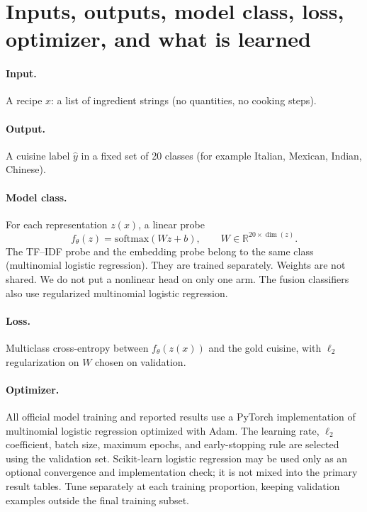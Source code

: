 ﻿\documentclass[11pt,letterpaper]{article}
\begin{document}
\section{Inputs, outputs, model class, loss, optimizer, and what is learned}

\paragraph{Input.}
A recipe $x$: a list of ingredient strings (no quantities, no cooking steps).

\paragraph{Output.}
A cuisine label $\hat{y}$ in a fixed set of 20 classes (for example Italian, Mexican, Indian, Chinese).

\paragraph{Model class.}
For each representation $z(x)$, a linear probe
\[
f_\theta(z)=\mathrm{softmax}(Wz+b),\qquad W\in\mathbb{R}^{20\times \dim(z)}.
\]
The TF--IDF probe and the embedding probe belong to the same class (multinomial logistic regression). They are trained separately. Weights are not shared. We do not put a nonlinear head on only one arm. The fusion classifiers also use regularized multinomial logistic regression.

\paragraph{Loss.}
Multiclass cross-entropy between $f_\theta(z(x))$ and the gold cuisine, with $\ell_2$ regularization on $W$ chosen on validation.

\paragraph{Optimizer.}
All official model training and reported results use a PyTorch implementation of multinomial logistic regression optimized with Adam. The learning rate, $\ell_2$ coefficient, batch size, maximum epochs, and early-stopping rule are selected using the validation set. Scikit-learn logistic regression may be used only as an optional convergence and implementation check; it is not mixed into the primary result tables. Tune separately at each training proportion, keeping validation examples outside the final training subset.
\end{document}
